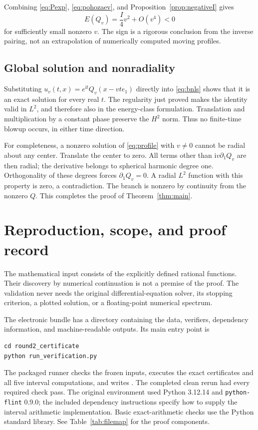 \documentclass[11pt,a4paper]{article}
\theoremstyle{definition}\newtheorem{definition}[theorem]{Definition}
\theoremstyle{remark}\newtheorem{remark}[theorem]{Remark}
\newcommand{\ii}{\mathrm i}
\newcommand{\file}[1]{\path{#1}}
\begin{document}
Combining \eqref{eq:Pexp}, \eqref{eq:pohozaev}, and Proposition~\ref{prop:negativeI} gives
\begin{equation}\label{eq:energyexp}
 E(Q_v)=\frac I4v^2+O(v^4)<0
\end{equation}
for sufficiently small nonzero \(v\). The sign is a rigorous conclusion from the inverse pairing, not an extrapolation of numerically computed moving profiles.

\subsection{Global solution and nonradiality}
Substituting \(u_v(t,x)=e^{\ii t}Q_v(x-vte_1)\) directly into \eqref{eq:bnls} shows that it is an exact solution for every real \(t\). The regularity just proved makes the identity valid in \(L^2\), and therefore also in the energy-class formulation. Translation and multiplication by a constant phase preserve the \(H^2\) norm. Thus no finite-time blowup occurs, in either time direction.

For completeness, a nonzero solution of \eqref{eq:profile} with \(v\ne0\) cannot be radial about any center. Translate the center to zero. All terms other than \(\ii v\partial_1Q_v\) are then radial; the derivative belongs to spherical harmonic degree one. Orthogonality of these degrees forces \(\partial_1Q_v=0\). A radial \(L^2\) function with this property is zero, a contradiction. The branch is nonzero by continuity from the nonzero \(Q\). This completes the proof of Theorem~\ref{thm:main}.

\section{Reproduction, scope, and proof record}\label{sec:repro}

The mathematical input consists of the explicitly defined rational functions. Their discovery by numerical continuation is not a premise of the proof. The validation never needs the original differential-equation solver, its stopping criterion, a plotted solution, or a floating-point numerical spectrum.

The electronic bundle has a \file{round2_certificate/} directory containing the data, verifiers, dependency information, and machine-readable outputs. Its main entry point is
\begin{lstlisting}
cd round2_certificate
python run_verification.py
\end{lstlisting}
The packaged runner checks the frozen inputs, executes the exact certificates and all five interval computations, and writes \file{VERIFICATION_SUMMARY.json}. The completed clean rerun had every required check pass. The original environment used Python 3.12.14 and \texttt{python-flint} 0.9.0; the included dependency instructions specify how to supply the interval arithmetic implementation. Basic exact-arithmetic checks use the Python standard library. See Table~\ref{tab:filemap} for the proof components.
\end{document}
